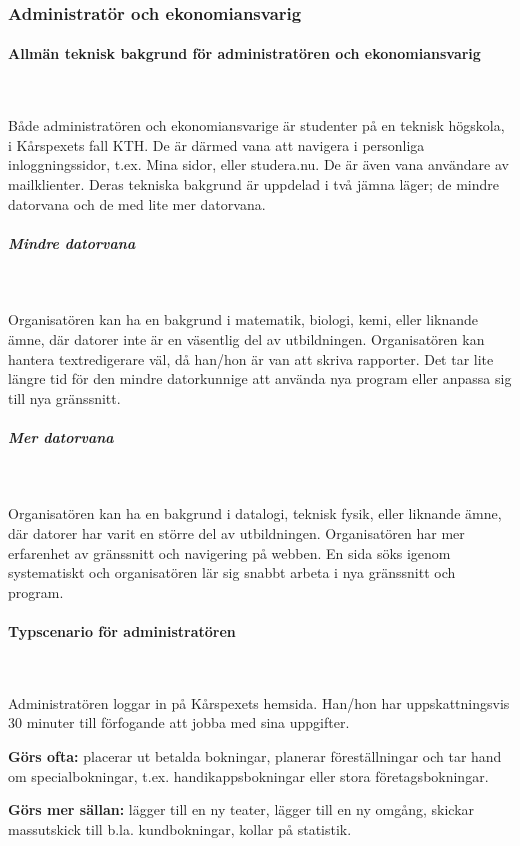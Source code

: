 \documentclass[a4paper, twoside, 11pt, titlepage]{article}
\begin{document}
		\subsubsection{Administratör och ekonomiansvarig}



			\paragraph{Allmän teknisk bakgrund för administratören och ekonomiansvarig}\

			Både administratören och ekonomiansvarige är studenter på en teknisk högskola, i Kårspexets fall KTH. De är därmed vana att navigera i personliga inloggningssidor, t.ex. Mina sidor, eller studera.nu. De är även vana användare av mailklienter. Deras tekniska bakgrund är uppdelad i två jämna läger; de mindre datorvana och de med lite mer datorvana.

			\subparagraph{\emph{Mindre datorvana}}\

				Organisatören kan ha en bakgrund i matematik, biologi, kemi, eller liknande ämne, där datorer inte är en väsentlig del av utbildningen. Organisatören kan hantera textredigerare väl, då han/hon är van att skriva rapporter. Det tar lite längre tid för den mindre datorkunnige att använda nya program eller anpassa sig till nya gränssnitt.

			\subparagraph{\emph{Mer datorvana}}\

				Organisatören kan ha en bakgrund i datalogi, teknisk fysik, eller liknande ämne, där datorer har varit en större del av utbildningen. Organisatören har mer erfarenhet av gränssnitt och navigering på webben. En sida söks igenom systematiskt och organisatören lär sig snabbt arbeta i nya gränssnitt och program.

			\paragraph{Typscenario för administratören}\

			Administratören loggar in på Kårspexets hemsida. Han/hon har uppskattningsvis 30 minuter till förfogande att jobba med sina uppgifter.

			\textbf{Görs ofta:} placerar ut betalda bokningar, planerar föreställningar och tar hand om specialbokningar, t.ex. handikappsbokningar eller stora företagsbokningar.

			\textbf{Görs mer sällan:} lägger till en ny teater, lägger till en ny omgång, skickar massutskick till b.la. kundbokningar, kollar på statistik.
\end{document}

